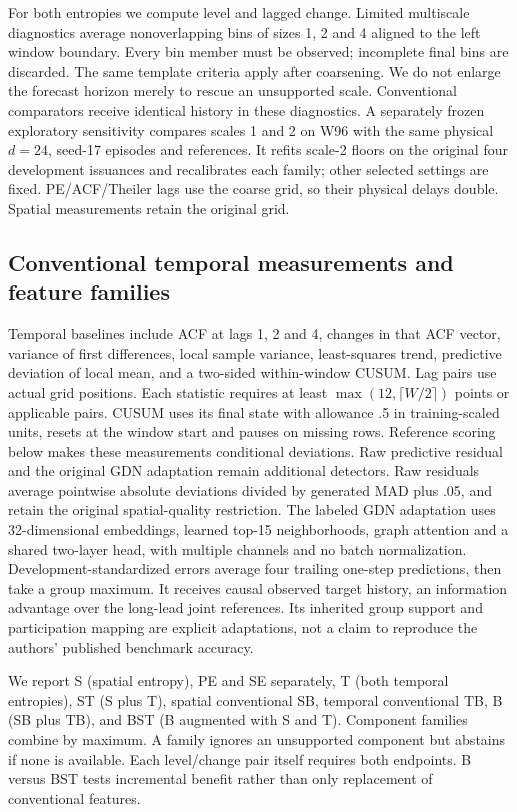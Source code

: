 \documentclass[conference]{IEEEtran}
\begin{document}
For both entropies we compute level and lagged change. Limited multiscale
diagnostics average nonoverlapping bins of sizes 1, 2 and 4 aligned to the left
window boundary. Every bin member must be observed; incomplete final bins are
discarded. The same template criteria apply after coarsening. We do not enlarge
the forecast horizon merely to rescue an unsupported scale. Conventional
comparators receive identical history in these diagnostics.
A separately frozen exploratory sensitivity compares scales 1 and 2 on W96
with the same physical $d=24$, seed-17 episodes and references. It refits scale-2
floors on the original four development issuances and recalibrates each family;
other selected settings are fixed. PE/ACF/Theiler lags use the coarse grid, so
their physical delays double. Spatial measurements retain the original grid.

\subsection{Conventional temporal measurements and feature families}
Temporal baselines include ACF at lags 1, 2 and 4, changes in that ACF vector,
variance of first differences, local sample variance, least-squares trend,
predictive deviation of local mean, and a two-sided within-window CUSUM.
Lag pairs use actual grid positions. Each statistic requires at least
$\max(12,\lceil W/2\rceil)$ points or applicable pairs. CUSUM uses its final state with allowance .5
in training-scaled units, resets at the window start and pauses on missing rows.
Reference scoring below makes these measurements conditional deviations. Raw
predictive residual and the original GDN adaptation remain additional detectors.
Raw residuals average pointwise absolute deviations divided by generated
MAD plus .05, and retain the original spatial-quality restriction. The labeled
GDN adaptation uses 32-dimensional embeddings, learned top-15 neighborhoods,
graph attention and a shared two-layer head, with multiple channels and no
batch normalization. Development-standardized errors average four trailing
one-step predictions, then take a group maximum. It receives causal observed
target history, an information advantage over the long-lead joint references.
Its inherited group support and participation mapping are explicit adaptations,
not a claim to reproduce the authors' published benchmark accuracy.

We report S (spatial entropy), PE and SE separately, T (both temporal
entropies), ST (S plus T), spatial conventional SB, temporal conventional TB,
B (SB plus TB), and BST (B augmented with S and T). Component families combine
by maximum. A family ignores an unsupported component but abstains if none is
available. Each level/change pair itself requires both endpoints. B versus BST
tests incremental benefit rather than only replacement of conventional features.
\end{document}
